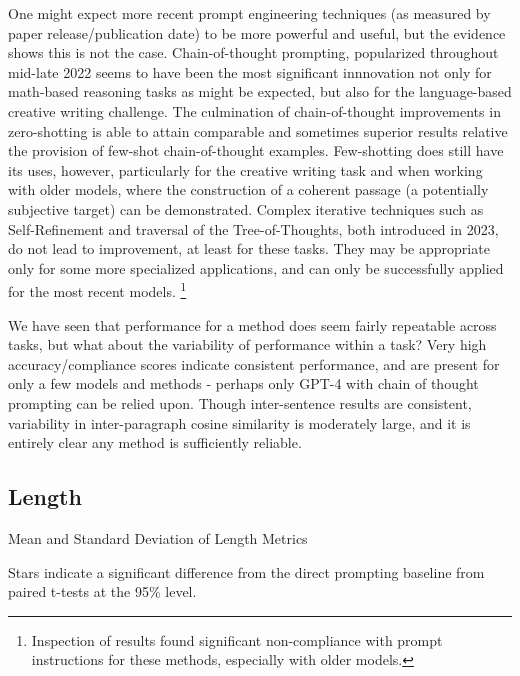 \documentclass[11pt]{article}
\begin{document}
One might expect more recent prompt engineering techniques (as measured by paper release/publication date) to be more powerful and useful, but the evidence shows this is not the case. Chain-of-thought prompting, popularized throughout mid-late 2022 seems to have been the most significant innnovation not only for math-based reasoning tasks as might be expected, but also for the language-based creative writing challenge. The culmination of chain-of-thought improvements in zero-shotting is able to attain comparable and sometimes superior results relative the provision of few-shot chain-of-thought examples. Few-shotting does still have its uses, however, particularly for the creative writing task and when working with older models, where the construction of a coherent passage (a potentially subjective target) can be demonstrated. Complex iterative techniques such as Self-Refinement and traversal of the Tree-of-Thoughts, both introduced in 2023, do not lead to improvement, at least for these tasks. They may be appropriate only for some more specialized applications, and can only be successfully applied for the most recent models. \footnote{Inspection of results found significant non-compliance with prompt instructions for these methods, especially with older models.}

We have seen that performance for a method does seem fairly repeatable across tasks, but what about the variability of performance within a task? Very high accuracy/compliance scores indicate consistent performance, and are present for only a few models and methods - perhaps only GPT-4 with chain of thought prompting can be relied upon. Though inter-sentence results are consistent, variability in inter-paragraph cosine similarity is moderately large, and it is entirely clear any method is sufficiently reliable.

\subsection*{Length}

\begin{table}
  \caption{Mean and Standard Deviation of Length Metrics}
  \centering
  \tiny
    
  \label{tab:avg_length_metrics_pivot}
  \newline \newline \footnotesize Stars indicate a significant difference from the direct prompting baseline from paired t-tests at the 95\% level.
\end{table}
\end{document}
